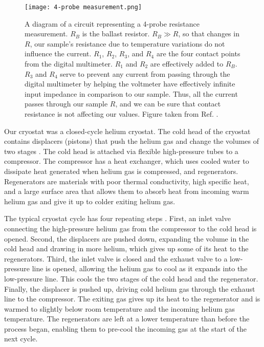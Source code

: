 \documentclass[11pt,letterpaper]{article}
\begin{document}
\begin{figure}
\centerline{\texttt{[image: 4-probe measurement.png]}}
\caption{A diagram of a circuit representing a 4-probe resistance measurement. $R_B$ is the ballast resistor. $R_B \gg R$, so that changes in $R$, our sample's resistance due to temperature variations do not influence the current. $R_1$, $R_2$, $R_3$, and $R_4$ are the four contact points from the digital multimeter. $R_1$ and $R_2$ are effectively added to $R_B$. $R_3$ and $R_4$ serve to prevent any current from passing through the digital multimeter by helping the voltmeter have effectively infinite input impedance in comparison to our sample. Thus, all the current passes through our sample $R$, and we can be sure that contact resistance is not affecting our values. Figure taken from Ref. \cite{Scofield}.} \label{4 probe}
\end{figure}

Our cryostat was a closed-cycle helium cryostat. The cold head of the cryostat contains displacers (pistons) that push the helium gas and change the volumes of two stages \cite{Jirmanus}. The cold head is attached via flexible high-pressure tubes to a compressor. The compressor has a heat exchanger, which uses cooled water to dissipate heat generated when helium gas is compressed, and regenerators. Regenerators are materials with poor thermal conductivity, high specific heat, and a large surface area that allows them to absorb heat from incoming warm helium gas and give it up to colder exiting helium gas.

The typical cryostat cycle has four repeating steps \cite{Jirmanus}. First, an inlet valve connecting the high-pressure helium gas from the compressor to the cold head is opened. Second, the displacers are pushed down, expanding the volume in the cold head and drawing in more helium, which gives up some of its heat to the regenerators. Third, the inlet valve is closed and the exhaust valve to a low-pressure line is opened, allowing the helium gas to cool as it expands into the low-pressure line. This cools the two stages of the cold head and the regenerator. Finally, the displacer is pushed up, driving cold helium gas through the exhaust line to the compressor. The exiting gas gives up its heat to the regenerator and is warmed to slightly below room temperature and the incoming helium gas temperature. The regenerators are left at a lower temperature than before the process began, enabling them to pre-cool the incoming gas at the start of the next cycle.
\end{document}
